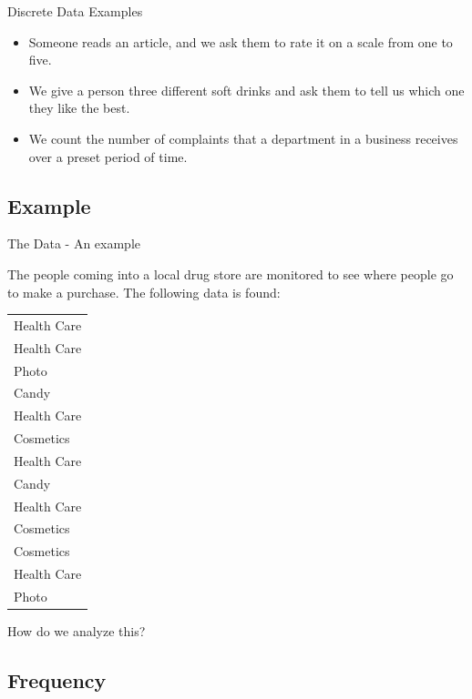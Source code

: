 \begin{frame}{Discrete Data Examples}

  \begin{itemize}
  \item Someone reads an article, and we ask them to rate it on a
    scale from one to five.

  \item We give a person three different soft drinks and ask them to
    tell us which one they like the best.

  \item We count the number of complaints that a department in a
    business receives over a preset period of time.

  \end{itemize}
  
\end{frame}

\subsection{Example}

\begin{frame}{The Data - An example}

  The people coming into a local drug store are monitored to see where
  people go to make a purchase. The following data is found: \\
  \begin{tabular}{l}
    Health Care \\
    Health Care \\
    Photo \\
    Candy \\
    Health Care \\
    Cosmetics \\
    Health Care \\
    Candy \\
    Health Care \\
    Cosmetics \\
    Cosmetics \\
    Health Care \\
    Photo 
  \end{tabular}

  How do we analyze this?
  
\end{frame}


\subsection{Frequency}

